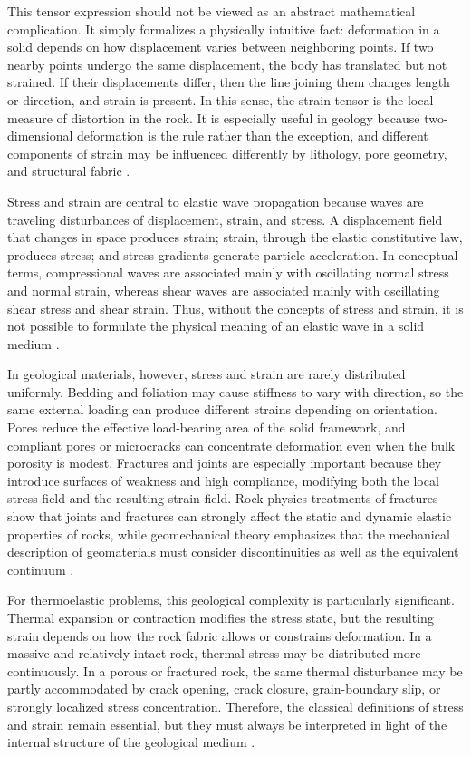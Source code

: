 This tensor expression should not be viewed as an abstract mathematical complication. It simply formalizes a physically intuitive fact: deformation in a solid depends on how displacement varies between neighboring points. If two nearby points undergo the same displacement, the body has translated but not strained. If their displacements differ, then the line joining them changes length or direction, and strain is present. In this sense, the strain tensor is the local measure of distortion in the rock. It is especially useful in geology because two-dimensional deformation is the rule rather than the exception, and different components of strain may be influenced differently by lithology, pore geometry, and structural fabric \cite{aki2002,jaeger2007}.

Stress and strain are central to elastic wave propagation because waves are traveling disturbances of displacement, strain, and stress. A displacement field that changes in space produces strain; strain, through the elastic constitutive law, produces stress; and stress gradients generate particle acceleration. In conceptual terms, compressional waves are associated mainly with oscillating normal stress and normal strain, whereas shear waves are associated mainly with oscillating shear stress and shear strain. Thus, without the concepts of stress and strain, it is not possible to formulate the physical meaning of an elastic wave in a solid medium \cite{aki2002,mavko2009}.

In geological materials, however, stress and strain are rarely distributed uniformly. Bedding and foliation may cause stiffness to vary with direction, so the same external loading can produce different strains depending on orientation. Pores reduce the effective load-bearing area of the solid framework, and compliant pores or microcracks can concentrate deformation even when the bulk porosity is modest. Fractures and joints are especially important because they introduce surfaces of weakness and high compliance, modifying both the local stress field and the resulting strain field. Rock-physics treatments of fractures show that joints and fractures can strongly affect the static and dynamic elastic properties of rocks, while geomechanical theory emphasizes that the mechanical description of geomaterials must consider discontinuities as well as the equivalent continuum \cite{mavko2009,cornet2007,jaeger2007}.

For thermoelastic problems, this geological complexity is particularly significant. Thermal expansion or contraction modifies the stress state, but the resulting strain depends on how the rock fabric allows or constrains deformation. In a massive and relatively intact rock, thermal stress may be distributed more continuously. In a porous or fractured rock, the same thermal disturbance may be partly accommodated by crack opening, crack closure, grain-boundary slip, or strongly localized stress concentration. Therefore, the classical definitions of stress and strain remain essential, but they must always be interpreted in light of the internal structure of the geological medium \cite{jaeger2007,mavko2009,cornet2007}.